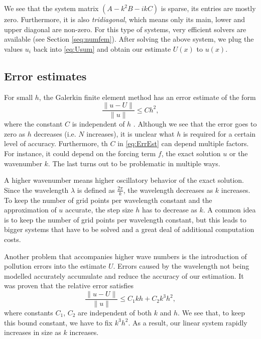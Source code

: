 \documentclass[a4paper]{article}
\begin{document}
We see that the system matrix $(A - k^2 B - i k C)$ is sparse, its
entries are mostly zero. Furthermore, it is also \emph{tridiagonal},
which means only its main, lower and upper diagonal are non-zero. For
this type of systems, very efficient solvers are available (see
Section \ref{seq:numfem}). After solving the above system, we plug the values
$u_i$ back into \eqref{eq:Usum} and obtain our estimate $U(x)$ to
$u(x)$.

\subsection{Error estimates}

For small $h$, the Galerkin finite element method has an error estimate
of the form
\begin{equation} \label{eq:ErrEst}
  \frac{\lVert u - U \rVert}{\lVert u \rVert} \leq C h^2,
\end{equation}
where the constant $C$ is independent of $h$ \cite[p.\ 10]{femnotes}.
Although we see that the error goes to zero as $h$ decreases (i.e. $N$
increases), it is unclear what $h$ is required for a certain level of
accuracy. Furthermore, th $C$ in \eqref{eq:ErrEst} can depend multiple
factors. For instance, it could depend on the forcing term $f$, the
exact solution $u$ or the wavenumber $k$. The last turns out to be
problematic in multiple ways.

A higher wavenumber means higher oscillatory behavior of the exact
solution. Since the wavelength $\lambda$ is defined as
$\frac{2\pi}{k}$, the wavelength decreases as $k$ increases. To keep
the number of grid points per wavelength constant and the approximation
of $u$ accurate, the step size $h$ has to decrease as $k$. A common
idea is to keep the number of grid points per wavelength constant, but
this leads to bigger systems that have to be solved and a great deal
of additional computation costs.

Another problem that accompanies higher wave numbers is the
introduction of pollution errors into the estimate $U$. Errors caused
by the wavelength not being modelled accurately accumulate and reduce
the accuracy of our estimation. It was proven \cite{femnotes} that the
relative error satisfies
\begin{equation} \label{eq:ErrEstK}
  \frac{\lVert u - U \rVert}{\lVert u \rVert} \leq C_1 k h + C_2 k^3
  h^2,
\end{equation}
where constants $C_1$, $C_2$ are independent of both $k$ and $h$. We
see that, to keep this bound constant, we have to fix $k^3 h^2$. As a
result, our linear system rapidly increases in size as $k$ increases.
\end{document}
